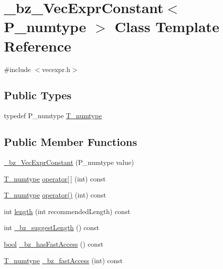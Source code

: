 \hypertarget{class__bz__VecExprConstant}{}\section{\+\_\+bz\+\_\+\+Vec\+Expr\+Constant$<$ P\+\_\+numtype $>$ Class Template Reference}
\label{class__bz__VecExprConstant}


{\ttfamily \#include $<$vecexpr.\+h$>$}

\subsection*{Public Types}
\begin{DoxyCompactItemize}
\item 
typedef P\+\_\+numtype \hyperlink{class__bz__VecExprConstant_a9777fdc15433eacc511b080b204361b1}{T\+\_\+numtype}
\end{DoxyCompactItemize}
\subsection*{Public Member Functions}
\begin{DoxyCompactItemize}
\item 
\hyperlink{class__bz__VecExprConstant_a19a50b09dc5062c4ad9581729501fb59}{\+\_\+bz\+\_\+\+Vec\+Expr\+Constant} (P\+\_\+numtype value)
\item 
\hyperlink{class__bz__VecExprConstant_a9777fdc15433eacc511b080b204361b1}{T\+\_\+numtype} \hyperlink{class__bz__VecExprConstant_a6ce8e7781b4083067922cc588198acb0}{operator\mbox{[}$\,$\mbox{]}} (int) const 
\item 
\hyperlink{class__bz__VecExprConstant_a9777fdc15433eacc511b080b204361b1}{T\+\_\+numtype} \hyperlink{class__bz__VecExprConstant_ac7a32dc26018472aac2ffe9b6e71567f}{operator()} (int) const 
\item 
int \hyperlink{class__bz__VecExprConstant_a7b99704a0ac06039d2bdd562529f3c37}{length} (int recommended\+Length) const 
\item 
int \hyperlink{class__bz__VecExprConstant_a4ccc2b57335a155229a0a9e2cfb9014d}{\+\_\+bz\+\_\+suggest\+Length} () const 
\item 
\hyperlink{compiler_8h_abb452686968e48b67397da5f97445f5b}{bool} \hyperlink{class__bz__VecExprConstant_a734d5e46b324ad1571415e6ac135ae83}{\+\_\+bz\+\_\+has\+Fast\+Access} () const 
\item 
\hyperlink{class__bz__VecExprConstant_a9777fdc15433eacc511b080b204361b1}{T\+\_\+numtype} \hyperlink{class__bz__VecExprConstant_ae3b46ea2df3dc491fa95cffa9e078aac}{\+\_\+bz\+\_\+fast\+Access} (int) const 
\end{DoxyCompactItemize}
